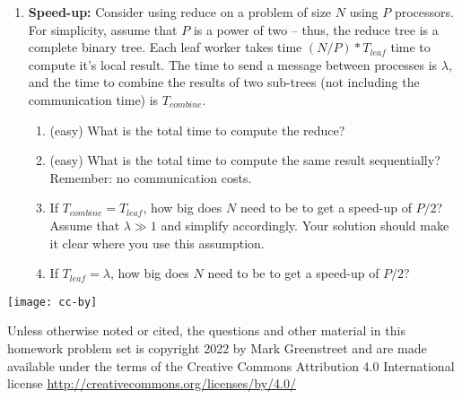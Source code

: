 \documentclass{article}
\begin{document}
\begin{enumerate}
  \item \textbf{Speed-up:}  Consider using reduce on a problem of size $N$ using $P$ processors.
    For simplicity, assume that $P$ is a power of two -- thus, the reduce tree is a complete binary tree.
    Each leaf worker takes time $(N/P)*T_{leaf}$ time to compute it's local result.  The time to send a
    message between processes is $\lambda$, and the time to combine the results of two sub-trees (not including
    the communication time) is $T_{combine}$.
    \begin{enumerate}
      \item (easy) What is the total time to compute the reduce?
      \item (easy) What is the total time to compute the same result sequentially?
	Remember: no communication costs.
      \item If $T_{combine}=T_{leaf}$, how big does $N$ need to be to get a speed-up of $P/2$?
	Assume that $\lambda \gg 1$ and simplify accordingly.
	Your solution should make it clear where you use this assumption.
      \item If $T_{leaf}=\lambda$, how big does $N$ need to be to get a speed-up of $P/2$?
    \end{enumerate}

\end{enumerate}

\vfill
\parbox{0.16\textwidth}{
  \texttt{[image: cc-by]}
}\hfill\parbox{0.80\textwidth}{
  \footnotesize
  Unless otherwise noted or cited, 
  the questions and other material in this homework problem set
  is copyright 2022 by Mark Greenstreet
  and are made available under the terms of the Creative Commons
  Attribution 4.0 International license
  \url{http://creativecommons.org/licenses/by/4.0/}
}
\end{document}
